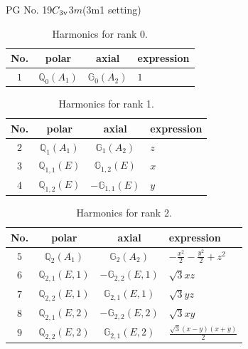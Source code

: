 \documentclass[fleqn,8pt,landscape]{jsarticle}
\begin{document}
\setcounter{MaxMatrixCols}{32}

\renewcommand{\tablename}{Table~}
\renewcommand{\figurename}{Figure~}
\begin{center}
\LARGE
PG No. 19\quad$C_{\rm 3v}$\quad$3m$\quad(3m1 setting)\quad[ trigonal ]
\end{center}
\begin{table}[ht!]
\begin{center}
\caption{Harmonics for rank 0.}
\renewcommand{\arraystretch}{1.3}
\begin{tabular}{cccl} \hline \hline
No. & polar & axial & expression \\ \hline
$ 1 $ & $ \mathbb{Q}_{0}(A_{1}) $ & $ \mathbb{G}_{0}(A_{2}) $ & $ 1 $ \\
 \hline \hline
\end{tabular}
\end{center}
\end{table}
\begin{table}[ht!]
\begin{center}
\caption{Harmonics for rank 1.}
\renewcommand{\arraystretch}{1.3}
\begin{tabular}{cccl} \hline \hline
No. & polar & axial & expression \\ \hline
$ 2 $ & $ \mathbb{Q}_{1}(A_{1}) $ & $ \mathbb{G}_{1}(A_{2}) $ & $ z $ \\
$ 3 $ & $ \mathbb{Q}_{1,1}(E) $ & $ \mathbb{G}_{1,2}(E) $ & $ x $ \\
$ 4 $ & $ \mathbb{Q}_{1,2}(E) $ & $ -\mathbb{G}_{1,1}(E) $ & $ y $ \\
 \hline \hline
\end{tabular}
\end{center}
\end{table}
\begin{table}[ht!]
\begin{center}
\caption{Harmonics for rank 2.}
\renewcommand{\arraystretch}{1.3}
\begin{tabular}{cccl} \hline \hline
No. & polar & axial & expression \\ \hline
$ 5 $ & $ \mathbb{Q}_{2}(A_{1}) $ & $ \mathbb{G}_{2}(A_{2}) $ & $ - \frac{x^{2}}{2} - \frac{y^{2}}{2} + z^{2} $ \\
$ 6 $ & $ \mathbb{Q}_{2,1}(E,1) $ & $ -\mathbb{G}_{2,2}(E,1) $ & $ \sqrt{3} x z $ \\
$ 7 $ & $ \mathbb{Q}_{2,2}(E,1) $ & $ \mathbb{G}_{2,1}(E,1) $ & $ \sqrt{3} y z $ \\
$ 8 $ & $ \mathbb{Q}_{2,1}(E,2) $ & $ -\mathbb{G}_{2,2}(E,2) $ & $ \sqrt{3} x y $ \\
$ 9 $ & $ \mathbb{Q}_{2,2}(E,2) $ & $ \mathbb{G}_{2,1}(E,2) $ & $ \frac{\sqrt{3} \left(x - y\right) \left(x + y\right)}{2} $ \\
 \hline \hline
\end{tabular}
\end{center}
\end{table}
\end{document}
